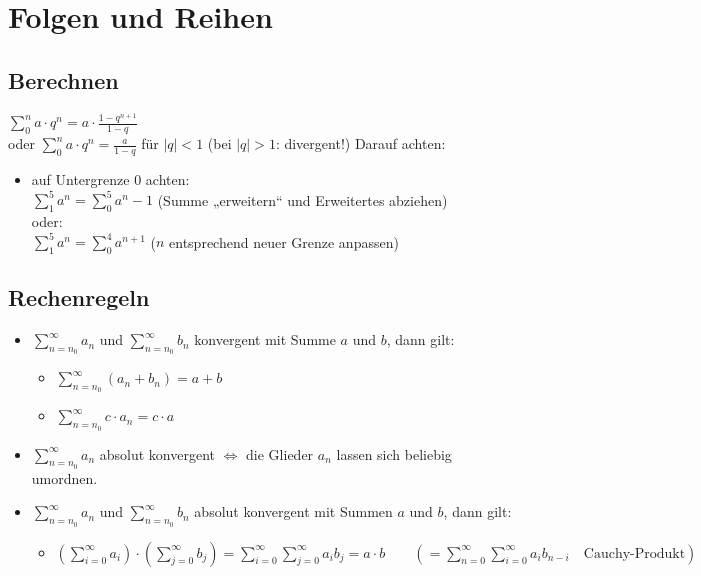 


\makeatletter
\renewcommand\tableofcontents{%
}
\makeatother



\tableofcontents
\newpage

\chapter{Folgen und Reihen}
\section{Berechnen}
$\sum_0^n a \cdot q^n=a\cdot \frac{1-q^{n+1}}{1-q}$\\
oder $\sum_0^n a \cdot q^n=\frac{a}{1-q}$ für $|q|<1$ (bei $|q|>1$: divergent!)
Darauf achten:
\begin{itemize}
\item auf Untergrenze $0$ achten:\\
$\sum_1^5 a^n = \sum_0^5 a^n -1$ (Summe „erweitern“ und Erweitertes abziehen)\\
oder:\\
$\sum_1^5 a^n = \sum_0^4 a^{n+1}$ ($n$ entsprechend neuer Grenze anpassen)
\end{itemize}
\section{Rechenregeln}
\begin{itemize}
\item $\sum_{n=n_0}^\infty a_n$ und $\sum_{n=n_0}^\infty b_n$ konvergent mit Summe $a$ und $b$, dann gilt: 
\begin{itemize}
\item $\sum_{n=n_0}^\infty (a_n+b_n)= a + b$
\item $\sum_{n=n_0}^\infty c\cdot a_n= c\cdot a$
\end{itemize}
\item $\sum_{n=n_0}^\infty a_n$ absolut konvergent $\Leftrightarrow$ die Glieder $a_n$ lassen sich beliebig umordnen.
\item $\sum_{n=n_0}^\infty a_n$ und $\sum_{n=n_0}^\infty b_n$ absolut konvergent mit Summen $a$ und $b$, dann gilt:
\begin{itemize}
\item $\left(\sum_{i=0}^\infty a_i\right)\cdot \left( \sum_{j=0}^\infty b_j\right)=\sum_{i=0}^\infty  \sum_{j=0}^\infty a_i b_j=a\cdot b \qquad \left( =\sum_{n=0}^\infty  \sum_{i=0}^\infty a_i b_{n-i} \quad \text{Cauchy-Produkt}\right)$
\end{itemize}
\end{itemize}
